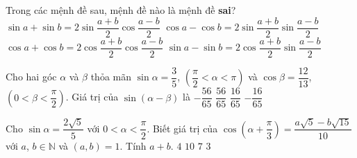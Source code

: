 \begin{ex}%
	Trong các mệnh đề sau, mệnh đề nào là  mệnh đề \textbf{sai}?
	 \choice
		{$\sin a+\sin b=2\sin \dfrac{a+b}{2}\cos \dfrac{a-b}{2}$} 
		{\True $\cos a-\cos b=2\sin \dfrac{a+b}{2}\sin  \dfrac{a-b}{2}$}
		{$\cos a+\cos b=2\cos \dfrac{a+b}{2}\cos  \dfrac{a-b}{2}$}
		{$\sin  a-\sin b=2\cos \dfrac{a+b}{2}\sin \dfrac{a-b}{2}$}
\end{ex}

\begin{ex}%
	Cho hai góc $\alpha$ và $\beta$ thỏa mãn  $\sin \alpha=\dfrac{3}{5}$, $\left(\dfrac{\pi}{2}<\alpha<\pi\right)$ và $\cos \beta=\dfrac{12}{13}$, $\left(0<\beta<\dfrac{\pi}{2}\right)$. Giá trị của $\sin (\alpha-\beta)$ là
	 \choice
		{$-\dfrac{56}{65}$} 
		{\True  $\dfrac{56}{65}$}
		 {$\dfrac{16}{65}$}
		 {$-\dfrac{16}{65}$}
\end{ex}

\begin{ex}%
	Cho $\sin \alpha=\dfrac{2 \sqrt{5}}{5}$ với $0<\alpha<\dfrac{\pi}{2}$. Biết giá  trị của $\cos \left(\alpha+\dfrac{\pi}{3}\right)=\dfrac{a \sqrt{5}-b \sqrt{15}}{10}$ với $a$, $b\in \mathbb{N}$ và $(a, b)=1$. Tính $a+b$.
	 \choice
		{$4$ } 
		 {$10$ }
		{$7$ } 
		 {\True$3$ }
\end{ex}

